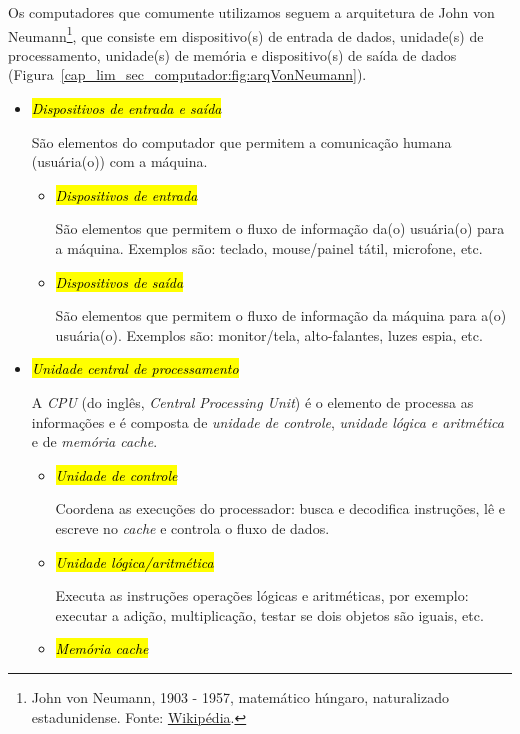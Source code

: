 Os computadores que comumente utilizamos seguem a arquitetura de John von Neumann\footnote{John von Neumann, 1903 - 1957, matemático húngaro, naturalizado estadunidense. Fonte: \href{https://pt.wikipedia.org/wiki/John_von_Neumann}{Wikipédia}.}, que consiste em dispositivo(s) de entrada de dados, unidade(s) de processamento, unidade(s) de memória e dispositivo(s) de saída de dados (Figura~\ref{cap_lim_sec_computador:fig:arqVonNeumann}).

\begin{itemize}
\item \hl{\emph{Dispositivos de entrada e saída}}

  São elementos do computador que permitem a comunicação humana (usuária(o)) com a máquina.

  \begin{itemize}
  \item \hl{\emph{Dispositivos de entrada}}

    São elementos que permitem o fluxo de informação da(o) usuária(o) para a máquina. Exemplos são: teclado, mouse/painel tátil, microfone, etc.

  \item \hl{\emph{Dispositivos de saída}}

    São elementos que permitem o fluxo de informação da máquina para a(o) usuária(o). Exemplos são: monitor/tela, alto-falantes, luzes espia, etc.
  \end{itemize}

\item \hl{\emph{Unidade central de processamento}}

  A \emph{CPU} (do inglês, {\it Central Processing Unit}) é o elemento de processa as informações e é composta de \emph{unidade de controle}, \emph{unidade lógica e aritmética} e de \emph{memória cache}.

  \begin{itemize}
  \item \hl{\emph{Unidade de controle}}

    Coordena as execuções do processador: busca e decodifica instruções, lê e escreve no {\it cache} e controla o fluxo de dados.

  \item \hl{\emph{Unidade lógica/aritmética}}

    Executa as instruções operações lógicas e aritméticas, por exemplo: executar a adição, multiplicação, testar se dois objetos são iguais, etc.

  \item \hl{\emph{Memória cache}}


\end{itemize}
\end{itemize}
